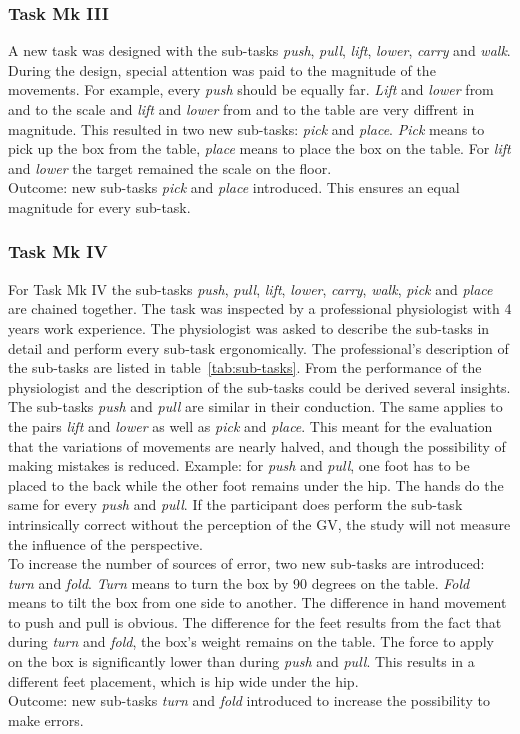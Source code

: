 \subsubsection{Task Mk III}
A new task was designed with the sub-tasks \textit{push}, \textit{pull}, \textit{lift}, \textit{lower}, \textit{carry} and \textit{walk}. During the design, special attention was paid to the magnitude of the movements. For example, every \textit{push} should be equally far. \textit{Lift} and \textit{lower} from and to the scale and \textit{lift} and \textit{lower} from and to the table are very diffrent in magnitude. This resulted in two new sub-tasks: \textit{pick} and \textit{place}. \textit{Pick} means to pick up the box from the table, \textit{place} means to place the box on the table. For \textit{lift} and \textit{lower} the target remained the scale on the floor.\\
Outcome: new sub-tasks \textit{pick} and \textit{place} introduced. This ensures an equal magnitude for every sub-task.

\subsubsection{Task Mk IV}
For Task Mk IV the sub-tasks \textit{push}, \textit{pull}, \textit{lift}, \textit{lower}, \textit{carry}, \textit{walk}, \textit{pick} and \textit{place} are chained together. The task was inspected by a professional physiologist with 4 years work experience. The physiologist was asked to describe the sub-tasks in detail and perform every sub-task ergonomically. The professional's description of the sub-tasks are listed in table~\ref{tab:sub-tasks}. From the performance of the physiologist and the description of the sub-tasks could be derived several insights. The sub-tasks \textit{push} and \textit{pull} are similar in their conduction. The same applies to the pairs \textit{lift} and \textit{lower} as well as \textit{pick} and \textit{place}. This meant for the evaluation that the variations of movements are nearly halved, and though the possibility of making mistakes is reduced. Example: for \textit{push} and \textit{pull}, one foot has to be placed to the back while the other foot remains under the hip. The hands do the same for every \textit{push} and \textit{pull}. If the participant does perform the sub-task intrinsically correct without the perception of the GV, the study will not measure the influence of the perspective.\\
To increase the number of sources of error, two new sub-tasks are introduced: \textit{turn} and \textit{fold}. \textit{Turn} means to turn the box by 90 degrees on the table. \textit{Fold} means to tilt the box from one side to another. The difference in hand movement to push and pull is obvious. The difference for the feet results from the fact that during \textit{turn} and \textit{fold}, the box's weight remains on the table. The force to apply on the box is significantly lower than during \textit{push} and \textit{pull}. This results in a different feet placement, which is hip wide under the hip.\\
Outcome: new sub-tasks \textit{turn} and \textit{fold} introduced to increase the possibility to make errors.

